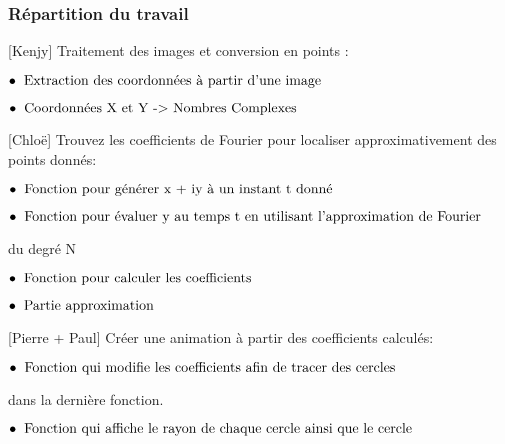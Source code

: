 \documentclass[aspectratio=169]{beamer}
\begin{document}
\begin{frame}
\frametitle{Répartition du travail }

[Kenjy] Traitement des images et conversion en points :

\hspace{1cm} $\bullet \hspace{0.2cm} \text{Extraction des coordonnées à partir d'une image}$

\hspace{1cm} $\bullet \hspace{0.2cm} \text{Coordonnées X et Y -> Nombres Complexes}$

[Chloë] Trouvez les coefficients de Fourier pour localiser approximativement des points donnés:

\hspace{1cm} $\bullet \hspace{0.2cm} \text{Fonction pour générer x + iy à un instant t donné}$

\hspace{1cm} $\bullet \hspace{0.2cm} \text{Fonction pour évaluer y au temps t en utilisant l'approximation de Fourier}$

\hspace{1.4cm} du degré N

\hspace{1cm} $\bullet \hspace{0.2cm} \text{Fonction pour calculer les coefficients}$

\hspace{1cm} $\bullet \hspace{0.2cm} \text{Partie approximation}$

[Pierre + Paul] Créer une animation à partir des coefficients calculés:

\hspace{1cm} $\bullet \hspace{0.2cm} \text{Fonction qui modifie les coefficients afin de tracer des cercles}$

\hspace{1.4cm} dans la dernière fonction.

\hspace{1cm} $\bullet \hspace{0.2cm} \text{Fonction qui affiche le rayon de chaque cercle ainsi que le cercle}$

\end{frame}
\end{document}

